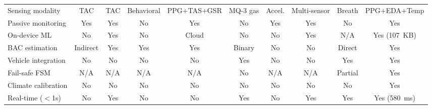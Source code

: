 \documentclass[HARVARD,Times2COL]{WileyNJDv5} %
\providecommand{\DIFdelbegin}{} %
\providecommand{\DIFaddendFL}{} %
\providecommand{\DIFscaledelfig}{0.5}
\newlength{\DIFdelgraphicswidth} %
\newlength{\DIFdelgraphicsheight} %
\providecommand{\DIFdelincludegraphics}[2][]{%
\sbox{\DIFdelgraphicsbox}{\DIFOincludegraphics[#1]{#2}}%
\settoboxwidth{\DIFdelgraphicswidth}{\DIFdelgraphicsbox} %
\settoboxtotalheight{\DIFdelgraphicsheight}{\DIFdelgraphicsbox} %
\scalebox{\DIFscaledelfig}{%
\parbox[b]{\DIFdelgraphicswidth}{\usebox{\DIFdelgraphicsbox}\\[-\baselineskip] \rule{\DIFdelgraphicswidth}{0em}}\llap{\resizebox{\DIFdelgraphicswidth}{\DIFdelgraphicsheight}{%
\setlength{\unitlength}{\DIFdelgraphicswidth}%
\begin{picture}(1,1)%
\thicklines\linethickness{2pt} %
{\color[rgb]{1,0,0}\put(0,0){\framebox(1,1){}}}%
{\color[rgb]{1,0,0}\put(0,0){\line( 1,1){1}}}%
{\color[rgb]{1,0,0}\put(0,1){\line(1,-1){1}}}%
\end{picture}%
}\hspace*{3pt}}} %
} %
\DeclareRobustCommand{\DIFdelbegin}{\DIFOdelbegin \let\includegraphics\DIFdelincludegraphics} %
\DeclareRobustCommand{\DIFaddendFL}{\DIFOaddendFL \let\includegraphics\DIFOincludegraphics} %
\begin{document}
\begin{table}[t]
{\begin{tabular}{@{}lccccccccc@{}}
\midrule
Sensing modality & TAC & TAC & Behavioral & PPG+TAS+GSR & MQ-3 gas & Accel. & Multi-sensor & Breath & PPG+EDA+Temp \\
Passive monitoring & Yes & Yes & No & Yes & No & Yes & Yes & No & Yes \\
On-device ML & No & Yes & No & Cloud & No & No & Yes & N/A & Yes (107~KB) \\
BAC estimation & Indirect & Yes & Yes & Yes & Binary & No & No & Direct & Yes \\
Vehicle integration & No & No & No & No & Yes & No & No & Yes & Yes \\
Fail-safe FSM & N/A & N/A & N/A & N/A & No & N/A & N/A & Partial & Yes \\
Climate calibration & No & No & No & No & No & No & No & No & Yes \\
Real-time ($<$1s) & No & Yes & No & No & Yes & No & Yes & Yes & Yes (580~ms) \\
\bottomrule
\end{tabular}
}
\DIFaddendFL \end{table}


\DIFdelbegin %
\end{document}
